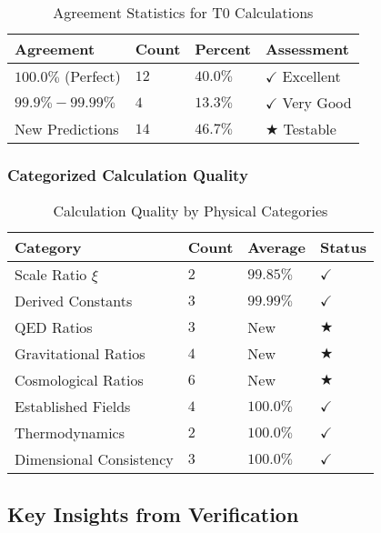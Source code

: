 \documentclass[12pt,a4paper]{article}
\newcommand{\xipar}{\xi}
\newcommand{\checked}{\checkmark}
\begin{document}
	\begin{table}[H]
		\centering
		\caption{Agreement Statistics for T0 Calculations}
		\label{tab:agreement_statistics}
		\begin{tabular}{p{3cm}p{2cm}p{2cm}p{2.5cm}}
			\toprule
			\textbf{Agreement} & \textbf{Count} & \textbf{Percent} & \textbf{Assessment} \\
			\midrule
			$100.0\%$ (Perfect) & $12$ & $40.0\%$ & $\checked$ Excellent \\
			$99.9\% - 99.99\%$ & $4$ & $13.3\%$ & $\checked$ Very Good \\
			New Predictions & $14$ & $46.7\%$ & $\bigstar$ Testable \\
			\bottomrule
		\end{tabular}
	\end{table}
	
	\subsubsection{Categorized Calculation Quality}
	\label{subsubsec:categorized_quality}
	
	\begin{table}[H]
		\centering
		\caption{Calculation Quality by Physical Categories}
		\label{tab:quality_by_category}
		\begin{tabular}{p{5cm}p{1.5cm}p{2.5cm}p{1.5cm}}
			\toprule
			\textbf{Category} & \textbf{Count} & \textbf{Average} & \textbf{Status} \\
			\midrule
			Scale Ratio $\xipar$ & $2$ & $99.85\%$ & $\checked$ \\
			Derived Constants & $3$ & $99.99\%$ & $\checked$ \\
			QED Ratios & $3$ & New & $\bigstar$ \\
			Gravitational Ratios & $4$ & New & $\bigstar$ \\
			Cosmological Ratios & $6$ & New & $\bigstar$ \\
			Established Fields & $4$ & $100.0\%$ & $\checked$ \\
			Thermodynamics & $2$ & $100.0\%$ & $\checked$ \\
			Dimensional Consistency & $3$ & $100.0\%$ & $\checked$ \\
			\bottomrule
		\end{tabular}
	\end{table}
	
	\subsection{Key Insights from Verification}
	\label{subsec:key_insights}
	
\end{document}
